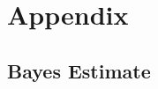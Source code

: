 \documentclass[ba]{imsart}
\begin{document}
	
	\clearpage
	
	\bigskip
	
	
	
	
	\clearpage
	
	\section{Appendix}
	\label{sec:appendix}
	
	\hypertarget{bayes-estimate}{%
		\subsection{Bayes Estimate}
		\label{bayes-estimate}}
	
\end{document}
